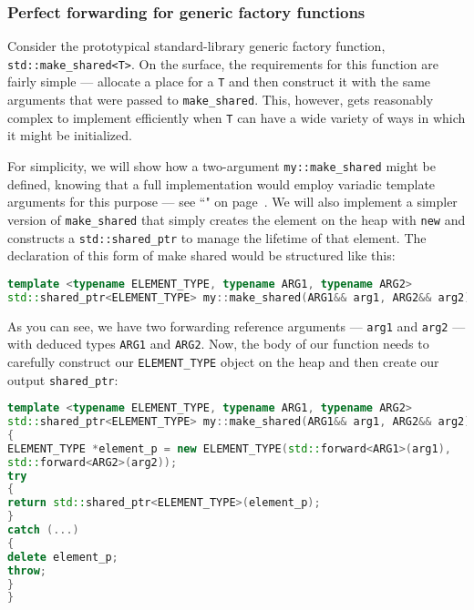 \subsubsection[Perfect forwarding for generic factory functions]{Perfect forwarding for generic factory functions}\label{perfect-forwarding-for-generic-factory-functions}

Consider the prototypical standard-library generic factory function,
\texttt{std::make\_shared<T>}. On the surface, the requirements for this
function are fairly simple --- allocate a place for a \texttt{T} and
then construct it with the same arguments that were passed to
\texttt{make\_shared}. This, however, gets reasonably complex to
implement efficiently when \texttt{T} can have a wide variety of ways in
which it might be initialized.

For simplicity, we will show how a two-argument \texttt{my::make\_shared}
might be defined, knowing that a full implementation would employ
variadic template arguments for this purpose --- see ``" on page~\pageref{variable-templates}. We will also implement a simpler
version of \texttt{make\_shared} that simply creates the element on the
heap with \texttt{new} and constructs a \texttt{std::shared\_ptr} to
manage the lifetime of that element. The declaration of this form of
make shared would be structured like this:

\begin{lstlisting}[language=C++]
template <typename ELEMENT_TYPE, typename ARG1, typename ARG2>
std::shared_ptr<ELEMENT_TYPE> my::make_shared(ARG1&& arg1, ARG2&& arg2)
\end{lstlisting}

\noindent As you can see, we have two forwarding reference arguments ---
\texttt{arg1} and \texttt{arg2} --- with deduced types \texttt{ARG1} and
\texttt{ARG2}. Now, the body of our function needs to carefully
construct our \texttt{ELEMENT\_TYPE} object on the heap and then create
our output \texttt{shared\_ptr}:

\begin{lstlisting}[language=C++]
template <typename ELEMENT_TYPE, typename ARG1, typename ARG2>
std::shared_ptr<ELEMENT_TYPE> my::make_shared(ARG1&& arg1, ARG2&& arg2)
{
ELEMENT_TYPE *element_p = new ELEMENT_TYPE(std::forward<ARG1>(arg1),
std::forward<ARG2>(arg2));
try
{
return std::shared_ptr<ELEMENT_TYPE>(element_p);
}
catch (...)
{
delete element_p;
throw;
}
}
\end{lstlisting}

